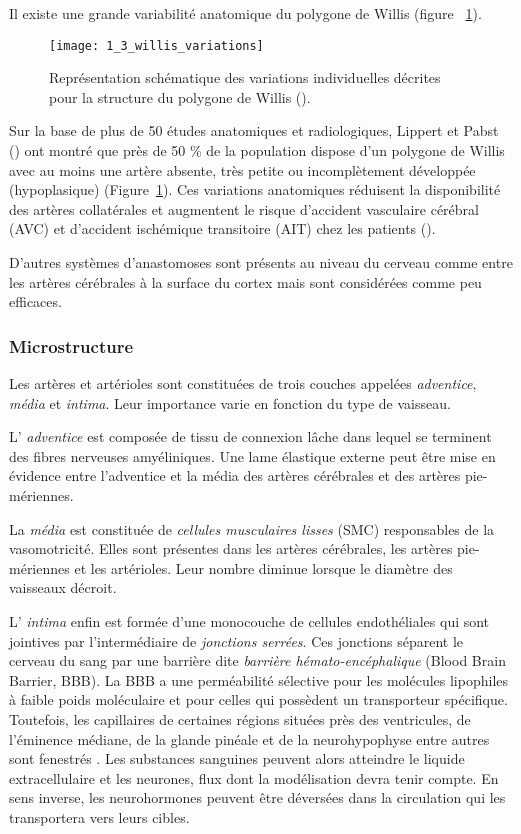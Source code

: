 Il existe une grande variabilité anatomique du polygone de Willis (figure ~\ref{fig:1_3_willis_variations}). 
\begin{figure}[!t]
\centering
\texttt{[image: 1\_3\_willis\_variations]}
\caption{Représentation schématique des variations individuelles décrites pour la structure du polygone de Willis (\cite{LippertPabst1985}). }
\label{fig:1_3_willis_variations}	
\end{figure}
Sur la base de plus de 50 études anatomiques et radiologiques, Lippert et Pabst (\cite{LippertPabst1985}) ont montré que près de 50 \% de la population dispose d’un polygone de Willis avec au moins une artère absente, très petite ou incomplètement développée (hypoplasique) (Figure~\ref{fig:1_3_willis_variations}). Ces variations anatomiques réduisent la disponibilité des artères collatérales et augmentent le risque d’accident vasculaire cérébral (AVC) et d’accident ischémique transitoire (AIT) chez les patients (\cite{Henderson2000}).

D’autres systèmes d’anastomoses sont présents au niveau du cerveau comme entre les artères cérébrales à la surface du cortex mais sont considérées comme peu efficaces.

\subsubsection{Microstructure}

Les artères et artérioles sont constituées de trois couches appelées {\em adventice},  {\em média} et  {\em intima}. Leur importance varie en fonction du type de vaisseau.

L’ {\em adventice} est composée de tissu de connexion lâche dans lequel se terminent des fibres nerveuses amyéliniques. Une lame élastique externe peut être mise en évidence entre l’adventice et la média des artères cérébrales et des artères pie-mériennes.

La  {\em média} est constituée de  {\em cellules musculaires lisses} (SMC) responsables de la vasomotricité. Elles sont présentes dans les artères cérébrales, les artères pie-mériennes et les artérioles. Leur nombre diminue lorsque le diamètre des vaisseaux décroit.

L’ {\em intima} enfin est formée d’une monocouche de cellules endothéliales qui sont jointives par l’intermédiaire de  {\em jonctions serrées}. Ces jonctions séparent le cerveau du sang par une barrière dite  {\em barrière hémato-encéphalique} (Blood Brain Barrier, BBB). La BBB a une perméabilité sélective pour les molécules lipophiles à faible poids moléculaire et pour celles qui possèdent un transporteur spécifique. Toutefois, les capillaires de certaines régions situées près des ventricules, de l'éminence médiane, de la glande pinéale et de la neurohypophyse entre autres sont fenestrés . Les substances sanguines peuvent alors atteindre le liquide extracellulaire et les neurones, flux dont la modélisation devra tenir compte. En sens inverse, les neurohormones peuvent être déversées dans la circulation qui les transportera vers leurs cibles.

